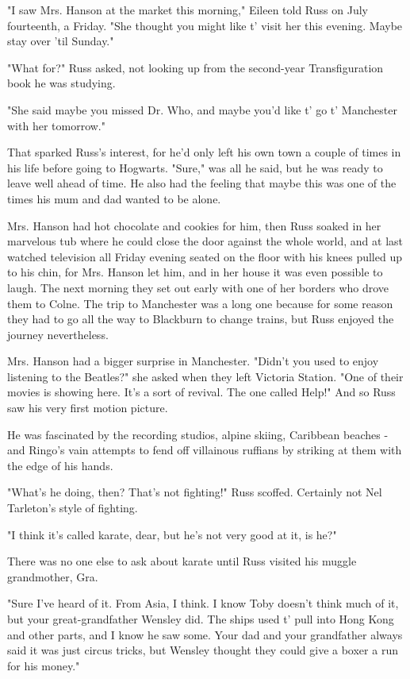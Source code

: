 \documentclass[a4paper,11pt]{article}
\begin{document}
"I saw Mrs. Hanson at the market this morning," Eileen told Russ on July fourteenth, a Friday. "She thought you might like t' visit her this evening. Maybe stay over 'til Sunday."

"What for?" Russ asked, not looking up from the second-year Transfiguration book he was studying.

"She said maybe you missed Dr. Who, and maybe you'd like t' go t' Manchester with her tomorrow."

That sparked Russ's interest, for he'd only left his own town a couple of times in his life before going to Hogwarts. "Sure," was all he said, but he was ready to leave well ahead of time. He also had the feeling that maybe this was one of the times his mum and dad wanted to be alone.

Mrs. Hanson had hot chocolate and cookies for him, then Russ soaked in her marvelous tub where he could close the door against the whole world, and at last watched television all Friday evening seated on the floor with his knees pulled up to his chin, for Mrs. Hanson let him, and in her house it was even possible to laugh. The next morning they set out early with one of her borders who drove them to Colne. The trip to Manchester was a long one because for some reason they had to go all the way to Blackburn to change trains, but Russ enjoyed the journey nevertheless.

Mrs. Hanson had a bigger surprise in Manchester. "Didn't you used to enjoy listening to the Beatles?" she asked when they left Victoria Station. "One of their movies is showing here. It's a sort of revival. The one called Help!" And so Russ saw his very first motion picture.

He was fascinated by the recording studios, alpine skiing, Caribbean beaches - and Ringo's vain attempts to fend off villainous ruffians by striking at them with the edge of his hands.

"What's he doing, then? That's not fighting!" Russ scoffed. Certainly not Nel Tarleton's style of fighting.

"I think it's called karate, dear, but he's not very good at it, is he?"

There was no one else to ask about karate until Russ visited his muggle grandmother, Gra.

"Sure I've heard of it. From Asia, I think. I know Toby doesn't think much of it, but your great-grandfather Wensley did. The ships used t' pull into Hong Kong and other parts, and I know he saw some. Your dad and your grandfather always said it was just circus tricks, but Wensley thought they could give a boxer a run for his money."
\end{document}
